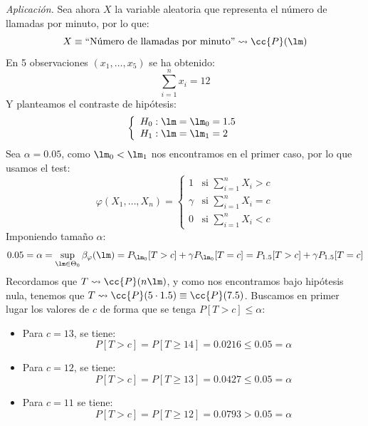 \begin{ejercicio}
    \noindent
    \textit{Aplicación.} Sea ahora $X$ la variable aleatoria que representa el número de llamadas por minuto, por lo que:
    \begin{equation*}
        X \equiv \text{``Número de llamadas por minuto''}\rightsquigarrow\cc{P}(\lm)
    \end{equation*}
    En 5 observaciones $(x_1, \ldots, x_5)$ se ha obtenido:
    \begin{equation*}
        \sum_{i=1}^{n} x_i = 12
    \end{equation*}
    Y planteamos el contraste de hipótesis:
    \begin{equation*}
        \left\{\begin{array}{l}
            H_0 : \lm = \lm_0 = 1.5 \\
            H_1 : \lm = \lm_1 = 2
        \end{array}\right.
    \end{equation*}
    Sea $\alpha = 0.05$, como $\lm_0<\lm_1$ nos encontramos en el primer caso, por lo que usamos el test:
    \begin{equation*}
        \varphi(X_1, \ldots, X_n) = \left\{\begin{array}{ll}
            1 & \text{si\ } \sum\limits_{i=1}^{n}X_i>c \\
            \gamma& \text{si\ } \sum\limits_{i=1}^{n}X_i = c \\
            0 & \text{si\ } \sum\limits_{i=1}^{n}X_i < c
        \end{array}\right. 
    \end{equation*}
    Imponiendo tamaño $\alpha$:
    \begin{equation*}
        0.05 = \alpha = \sup_{\lm \in \Theta_0}\beta_\varphi(\lm) = P_{\lm_0}[T > c] + \gamma P_{\lm_0}[T=c] = P_{1.5}[T>c] + \gamma P_{1.5}[T=c]
    \end{equation*}
    Recordamos que $T\rightsquigarrow \cc{P}(n\lm)$, y como nos encontramos bajo hipótesis nula, tenemos que $T\rightsquigarrow \cc{P}(5\cdot 1.5) \equiv \cc{P}(7.5)$. Buscamos en primer lugar los valores de $c$ de forma que se tenga $P[T>c]\leq \alpha$:
    \begin{itemize}
        \item Para $c=13$, se tiene:
            \begin{equation*}
                P[T>c] = P[T\geq 14] = 0.0216 \leq 0.05 = \alpha
            \end{equation*}
        \item Para $c=12$, se tiene:
            \begin{equation*}
                P[T>c] = P[T\geq 13] = 0.0427 \leq 0.05 = \alpha
            \end{equation*}
        \item Para $c=11$ se tiene:
            \begin{equation*}
                P[T>c] = P[T\geq 12] = 0.0793 > 0.05 = \alpha
            \end{equation*}
    \end{itemize}


\end{ejercicio}
